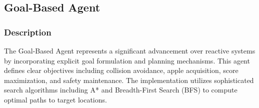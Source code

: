 \documentclass[11pt,a4paper]{article}
\begin{document}
\subsection{Goal-Based Agent}

\subsubsection{Description}
The Goal-Based Agent represents a significant advancement over reactive systems by incorporating explicit goal formulation and planning mechanisms. This agent defines clear objectives including collision avoidance, apple acquisition, score maximization, and safety maintenance. The implementation utilizes sophisticated search algorithms including A* and Breadth-First Search (BFS) to compute optimal paths to target locations.
\end{document}
